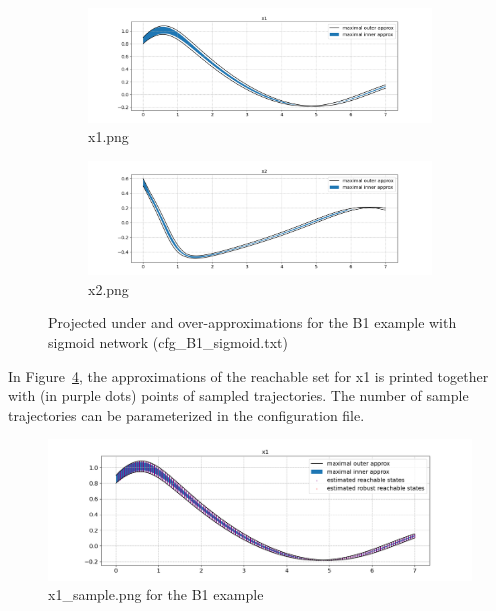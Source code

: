 \documentclass{article}
\begin{document}
\begin{figure}[htbp]
\centering
\begin{subfigure}{.5\textwidth}
  \centering
  \includegraphics[width=.99\linewidth]{x1_B1sig.png}
  \caption{x1.png}
  \label{fig:sub1}
\end{subfigure}%
\begin{subfigure}{.5\textwidth}
  \centering
  \includegraphics[width=.99\linewidth]{x2_B1sig.png}
  \caption{x2.png}
  \label{fig:sub2}
\end{subfigure}
\caption{Projected under and over-approximations for the B1 example with sigmoid network (cfg\_B1\_sigmoid.txt)}
\label{fig:Proj_B1}
\end{figure}
In Figure~\ref{fig:Proj_sample_B1}, the  approximations of the reachable set for x1 is printed together with (in purple dots) points of sampled trajectories.  The number of sample trajectories can be parameterized in the configuration file.  
\begin{figure}[htbp]
\centering
  \includegraphics[width=.99\linewidth]{x1_sample_B1sig.png}
\caption{ x1\_sample.png for the B1 example}
\label{fig:Proj_sample_B1}
\end{figure}
\end{document}
